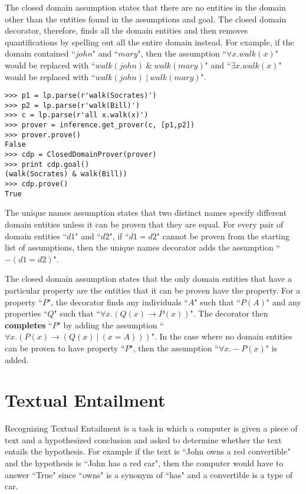 \documentclass{article}
\begin{document}
The closed domain assumption states that there are no entities in the domain other than the entities found in the assumptions and goal.  The closed domain decorator, therefore, finds all the domain entities and then removes quantifications by spelling out all the entire domain instead.  For example, if the domain contained ``$john$" and ``$mary$", then the assumption ``$\forall x.walk(x)$" would be replaced with ``$walk(john)~\&~walk(mary)$" and ``$\exists x.walk(x)$" would be replaced with ``$walk(john)~|~walk(mary)$".

\begin{verbatim}
>>> p1 = lp.parse(r'walk(Socrates)')
>>> p2 = lp.parse(r'walk(Bill)')
>>> c = lp.parse(r'all x.walk(x)')
>>> prover = inference.get_prover(c, [p1,p2])
>>> prover.prove()
False
>>> cdp = ClosedDomainProver(prover)
>>> print cdp.goal()
(walk(Socrates) & walk(Bill))
>>> cdp.prove()
True
\end{verbatim}

The unique names assumption states that two distinct names specify different domain entities unless it can be proven that they are equal.  For every pair of domain entities ``$d1$" and ``$d2$", if ``$d1 = d2$" cannot be proven from the starting list of assumptions, then the unique names decorator adds the assumption ``$-(d1 = d2)$".

The closed domain assumption states that the only domain entities that have a particular property are the entities that it can be proven have the property.  For a property ``$P$", the decorator finds any individuals ``$A$" such that ``$P(A)$" and any properties ``$Q$" such that ``$\forall x.(Q(x) \rightarrow P(x))$".  The decorator then \textbf{completes} ``$P$" by adding the assumption ``$\forall x.(P(x) \rightarrow (Q(x)~|~(x = A)))$".  In the case where no domain entities can be proven to have property ``$P$", then the assumption ``$\forall x.-P(x)$" is added.


\section{Textual Entailment}
Recognizing Textual Entailment is a task in which a computer is given a piece of text and a hypothesized conclusion and asked to determine whether the text entails the hypothesis.  For example if the text is ``John owns a red convertible" and the hypothesis is ``John has a red car", then the computer would have to answer ``True" since ``owns" is a synonym of ``has" and a convertible is a type of car.  
\end{document}
